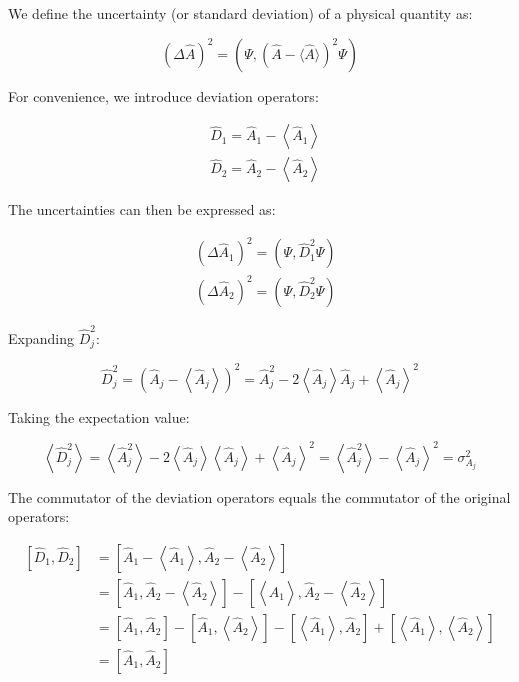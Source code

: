 \documentclass[10pt]{article}
\begin{document}
We define the uncertainty (or standard deviation) of a physical quantity as:

\begin{equation*}
(\Delta \hat{A})^{2}=\left(\Psi,(\hat{A}-\langle\hat{A}\rangle)^{2} \Psi\right) \tag{7.4}
\end{equation*}

For convenience, we introduce deviation operators:

\begin{align*}
& \hat{D}_{1}=\hat{A}_{1}-\left\langle\hat{A}_{1}\right\rangle \\
& \hat{D}_{2}=\hat{A}_{2}-\left\langle\hat{A}_{2}\right\rangle \tag{7.5}
\end{align*}

The uncertainties can then be expressed as:

\begin{align*}
& \left(\Delta \hat{A}_{1}\right)^{2}=\left(\Psi, \hat{D}_{1}^{2} \Psi\right) \\
& \left(\Delta \hat{A}_{2}\right)^{2}=\left(\Psi, \hat{D}_{2}^{2} \Psi\right) \tag{7.6}
\end{align*}

Expanding $\hat{D}_j^2$:

\begin{equation*}
\hat{D}_{j}^{2}=\left(\hat{A}_{j}-\left\langle\hat{A}_{j}\right\rangle\right)^{2}=\hat{A}_{j}^{2}-2\left\langle\hat{A}_{j}\right\rangle \hat{A}_{j}+\left\langle\hat{A}_{j}\right\rangle^{2} \tag{7.7}
\end{equation*}

Taking the expectation value:

\begin{equation*}
\left\langle\hat{D}_{j}^{2}\right\rangle=\left\langle\hat{A}_{j}^{2}\right\rangle-2\left\langle\hat{A}_{j}\right\rangle\left\langle\hat{A}_{j}\right\rangle+\left\langle\hat{A}_{j}\right\rangle^{2}=\left\langle\hat{A}_{j}^{2}\right\rangle-\left\langle\hat{A}_{j}\right\rangle^{2}=\sigma_{A_{j}}^{2} \tag{7.8}
\end{equation*}

The commutator of the deviation operators equals the commutator of the original operators:

\begin{align*}
{\left[\hat{D}_{1}, \hat{D}_{2}\right] } & =\left[\hat{A}_{1}-\left\langle\hat{A}_{1}\right\rangle, \hat{A}_{2}-\left\langle\hat{A}_{2}\right\rangle\right] \\
& =\left[\hat{A}_{1}, \hat{A}_{2}-\left\langle\hat{A}_{2}\right\rangle\right]-\left[\left\langle\hat{A}_{1}\right\rangle, \hat{A}_{2}-\left\langle\hat{A}_{2}\right\rangle\right] \\
& =\left[\hat{A}_{1}, \hat{A}_{2}\right]-\left[\hat{A}_{1},\left\langle\hat{A}_{2}\right\rangle\right]-\left[\left\langle\hat{A}_{1}\right\rangle, \hat{A}_{2}\right]+\left[\left\langle\hat{A}_{1}\right\rangle,\left\langle\hat{A}_{2}\right\rangle\right]  \tag{7.9}\\
& =\left[\hat{A}_{1}, \hat{A}_{2}\right]
\end{align*}
\end{document}
